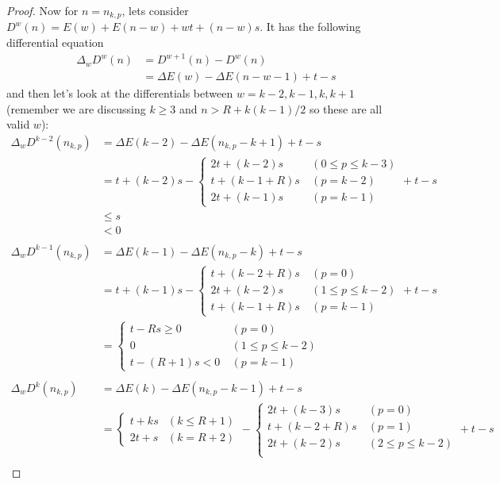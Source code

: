 \documentclass[]{article}
\begin{document}
\begin{proof}
Now for $n = n_{k, p}$, lets consider $D^w(n) = E(w) + E(n-w) + wt + (n-w)s$. It has the following differential equation
\begin{align*}
\Delta_w D^w(n) &= D^{w+1}(n)-D^w(n) \\
&= \Delta E(w) - \Delta E(n-w-1) + t -s
\end{align*}
and then let's look at the differentials between $w = k-2, k-1, k, k+1$ (remember we are discussing $k\geq3$ and $n > R + k(k-1)/2 $ so these are all valid $w$):
\begin{align*}
\Delta_w D^{k-2}(n_{k,p}) &=  \Delta E(k-2) - \Delta E(n_{k,p}-k+1) + t -s \\
&= t+(k-2)s - \begin{cases}
2t + (k-2)s\ &(0\leq p \leq k-3)\\
t + (k-1+R)s\ &(p = k-2)\\
2t + (k-1)s\ &(p = k-1)
\end{cases} + t-s\\
&\leq s \\
&< 0 \\ \\
\Delta_w D^{k-1}(n_{k,p}) &=  \Delta E(k-1) - \Delta E(n_{k,p}-k) + t -s \\
&= t+(k-1)s - \begin{cases}
t + (k-2+R)s\ &(p =0)\\
2t + (k-2)s\ &(1\leq p\leq k-2)\\
t + (k-1+R)s\ &(p = k-1)
\end{cases} + t-s\\
&= \begin{cases}
t -Rs \geq 0\ &(p =0)\\
0\ &(1\leq p \leq k-2)\\
t -(R+1)s < 0\ &(p = k-1)
\end{cases}\\ \\ 
\Delta_w D^{k}(n_{k,p}) &=  \Delta E(k) - \Delta E(n_{k,p}-k-1) + t -s \\
&= \begin{cases}
t+ks &(k \leq R + 1)\\
2t+s&(k = R + 2)
\end{cases} - \begin{cases}
2t + (k-3)s\ &(p =0)\\
t + (k-2+R)s\ &(p =1)\\
2t + (k-2)s\ &(2\leq p \leq k-2)\\
\end{cases} + t-s\\

\end{align*}
\end{proof}
\end{document}
